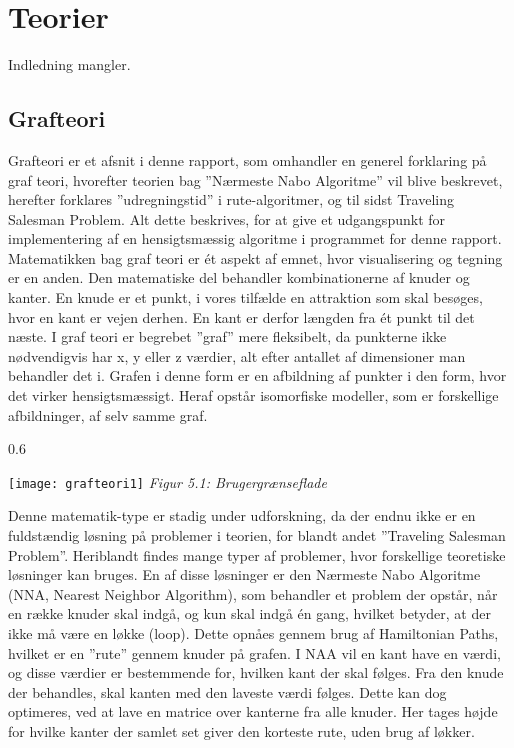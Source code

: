 \section{Teorier}
Indledning mangler.

\subsection{Grafteori}
Grafteori er et afsnit i denne rapport, som omhandler en generel forklaring på graf teori, hvorefter teorien bag ”Nærmeste Nabo Algoritme” vil blive beskrevet, herefter forklares ”udregningstid” i rute-algoritmer, og til sidst Traveling Salesman Problem. Alt dette beskrives, for at give et udgangspunkt for implementering af en hensigtsmæssig algoritme i programmet for denne rapport.\newline
Matematikken bag graf teori er ét aspekt af emnet, hvor visualisering og tegning er en anden. Den matematiske del behandler kombinationerne af knuder og kanter. En knude er et punkt, i vores tilfælde en attraktion som skal besøges, hvor en kant er vejen derhen. En kant er derfor længden fra ét punkt til det næste.
I graf teori er begrebet ”graf” mere fleksibelt, da punkterne ikke nødvendigvis har x, y eller z værdier, alt efter antallet af dimensioner man behandler det i. Grafen i denne form er en afbildning af punkter i den form, hvor det virker hensigtsmæssigt. Heraf opstår isomorfiske modeller, som er forskellige afbildninger, af selv samme graf. 

\begin{wrapfigure}{}{0.6\textwidth}
  \vspace{-20pt}
  \begin{center}
    \texttt{[image: grafteori1]} \newline
    \textit{Figur 5.1: Brugergrænseflade}\newline
  \end{center}
  \vspace{-20pt}
  \vspace{-20pt}
\end{wrapfigure}

Denne matematik-type er stadig under udforskning, da der endnu ikke er en fuldstændig løsning på problemer i teorien, for blandt andet ”Traveling Salesman Problem”. Heriblandt findes mange typer af problemer, hvor forskellige teoretiske løsninger kan bruges. En af disse løsninger er den Nærmeste Nabo Algoritme (NNA, Nearest Neighbor Algorithm), som behandler et problem der opstår, når en række knuder skal indgå, og kun skal indgå én gang, hvilket betyder, at der ikke må være en løkke (loop). Dette opnåes gennem brug af Hamiltonian Paths, hvilket er en ”rute” gennem knuder på grafen. I NAA vil en kant have en værdi, og disse værdier er bestemmende for, hvilken kant der skal følges. Fra den knude der behandles, skal kanten med den laveste værdi følges. Dette kan dog optimeres, ved at lave en matrice over kanterne fra alle knuder. Her tages højde for hvilke kanter der samlet set giver den korteste rute, uden brug af løkker.

